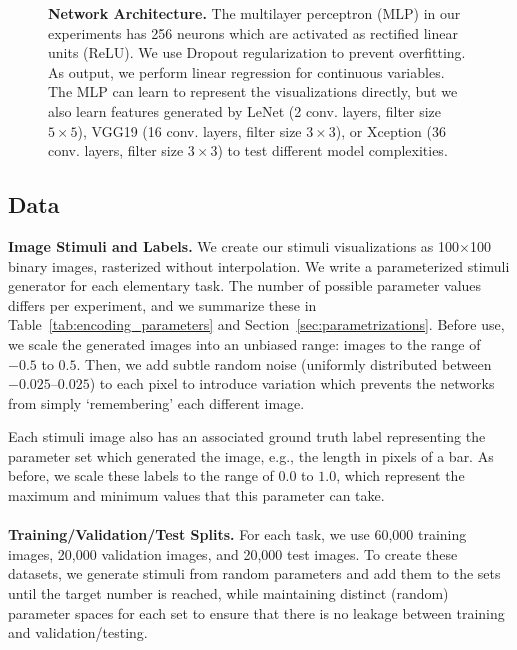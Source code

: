 \begin{figure}[t]
	\centering
	
	\hfill

  \caption{\textbf{Network Architecture.} The multilayer perceptron (MLP) in our experiments has 256 neurons which are activated as rectified linear units (ReLU). We use Dropout regularization to prevent overfitting. As output, we perform linear regression for continuous variables. The MLP can learn to represent the visualizations directly, but we also learn features generated by LeNet (2 conv. layers, filter size $5\times5$), VGG19 (16 conv. layers, filter size $3\times3$), or Xception (36 conv. layers, filter size $3\times3$) to test different model complexities.}
	\label{fig:classifiers}
\end{figure}

\subsection{Data}
\label{sec:data}

\noindent\textbf{Image Stimuli and Labels.} 
We create our stimuli visualizations as 100$\times$100 binary images, rasterized without interpolation. We write a parameterized stimuli generator for each elementary task. The number of possible parameter values differs per experiment, and we summarize these in Table~\ref{tab:encoding_parameters} and Section~\ref{sec:parametrizations}. Before use, we scale the generated images into an unbiased range: images to the range of $-0.5$ to $0.5$. Then, we add subtle random noise (uniformly distributed between $-0.025$--$0.025$) to each pixel to introduce variation which prevents the networks from simply `remembering' each different image.

Each stimuli image also has an associated ground truth label representing the parameter set which generated the image, e.g., the length in pixels of a bar. As before, we scale these labels to the range of $0.0$ to $1.0$, which represent the maximum and minimum values that this parameter can take.
\\~\\
\noindent\textbf{Training/Validation/Test Splits.} For each task, we use 60,000 training images, 20,000 validation images, and 20,000 test images. To create these datasets, we generate stimuli from random parameters and add them to the sets until the target number is reached, while maintaining distinct (random) parameter spaces for each set to ensure that there is no leakage between training and validation/testing.

